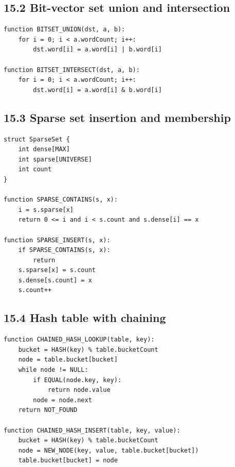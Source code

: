 \documentclass[10pt,letterpaper]{article}
\begin{document}
\subsection*{15.2 Bit-vector set union and intersection}
{}

\begin{verbatim}
function BITSET_UNION(dst, a, b):
    for i = 0; i < a.wordCount; i++:
        dst.word[i] = a.word[i] | b.word[i]

function BITSET_INTERSECT(dst, a, b):
    for i = 0; i < a.wordCount; i++:
        dst.word[i] = a.word[i] & b.word[i]
\end{verbatim}

\subsection*{15.3 Sparse set insertion and membership}
{}

\begin{verbatim}
struct SparseSet {
    int dense[MAX]
    int sparse[UNIVERSE]
    int count
}

function SPARSE_CONTAINS(s, x):
    i = s.sparse[x]
    return 0 <= i and i < s.count and s.dense[i] == x

function SPARSE_INSERT(s, x):
    if SPARSE_CONTAINS(s, x):
        return
    s.sparse[x] = s.count
    s.dense[s.count] = x
    s.count++
\end{verbatim}

\subsection*{15.4 Hash table with chaining}
{}

\begin{verbatim}
function CHAINED_HASH_LOOKUP(table, key):
    bucket = HASH(key) % table.bucketCount
    node = table.bucket[bucket]
    while node != NULL:
        if EQUAL(node.key, key):
            return node.value
        node = node.next
    return NOT_FOUND

function CHAINED_HASH_INSERT(table, key, value):
    bucket = HASH(key) % table.bucketCount
    node = NEW_NODE(key, value, table.bucket[bucket])
    table.bucket[bucket] = node
\end{verbatim}
\end{document}
